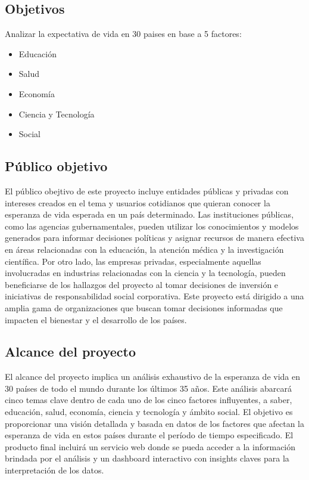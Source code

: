 \documentclass{other/docTemplate}
\begin{document}
\subsection{Objetivos}
Analizar la expectativa de vida en 30 paises en base a 5 factores:
\begin{itemize}
  \item Educación
  \item Salud
  \item Economía
  \item Ciencia y Tecnología
  \item Social
\end{itemize}

\subsection{Público objetivo}
El público obejtivo de este proyecto incluye entidades públicas y privadas con intereses creados en el tema y usuarios cotidianos que quieran conocer la esperanza de vida esperada en un país determinado. 
 Las instituciones públicas, como las agencias gubernamentales, pueden utilizar los conocimientos y modelos generados para informar decisiones políticas y asignar recursos de manera efectiva en áreas relacionadas con la educación, la atención médica y la investigación científica. Por otro lado, las empresas privadas, especialmente aquellas involucradas en industrias relacionadas con la ciencia y la tecnología, pueden beneficiarse de los hallazgos del proyecto al tomar decisiones de inversión e iniciativas de responsabilidad social corporativa. Este proyecto está dirigido a una amplia gama de organizaciones que buscan tomar decisiones informadas que impacten el bienestar y el desarrollo de los países.

\subsection{Alcance del proyecto}
El alcance del proyecto implica un análisis exhaustivo de la esperanza de vida en 30 países de todo el mundo durante los últimos 35 años. Este análisis abarcará cinco temas clave dentro de cada uno de los cinco factores influyentes, a saber, educación, salud, economía, ciencia y tecnología y ámbito social. El objetivo es proporcionar una visión detallada y basada en datos de los factores que afectan la esperanza de vida en estos países durante el período de tiempo especificado.
 El producto final incluirá un servicio web donde se pueda acceder a la información brindada por el análisis y un dashboard interactivo con insights claves para la interpretación de los datos. 
\end{document}
